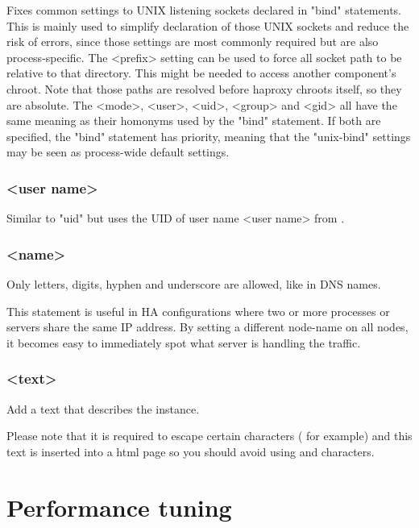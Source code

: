 Fixes common settings to UNIX listening sockets declared in "bind" statements.
This is mainly used to simplify declaration of those UNIX sockets and reduce
the risk of errors, since those settings are most commonly required but are
also process-specific. The <prefix> setting can be used to force all socket
path to be relative to that directory. This might be needed to access another
component's chroot. Note that those paths are resolved before haproxy chroots
itself, so they are absolute. The <mode>, <user>, <uid>, <group> and <gid>
all have the same meaning as their homonyms used by the "bind" statement. If
both are specified, the "bind" statement has priority, meaning that the
"unix-bind" settings may be seen as process-wide default settings.

\subsubsection[user]{ <user name>}

Similar to "uid" but uses the UID of user name <user name> from .

\subsubsection[node]{ <name>}

Only letters, digits, hyphen and underscore are allowed, like in DNS names.

This statement is useful in HA configurations where two or more processes or
servers share the same IP address. By setting a different node-name on all
nodes, it becomes easy to immediately spot what server is handling the
traffic.

\subsubsection[description]{ <text>}

Add a text that describes the instance.

Please note that it is required to escape certain characters (\chr{\#} for example)
and this text is inserted into a html page so you should avoid using
\chr{<} and \chr{>} characters.

\section{Performance tuning}
\label{sec:performance}

